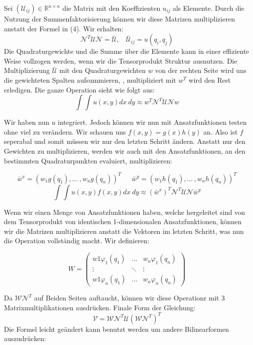 Sei $(\mathcal{U}_{ij}) \in \mathbb{R}^{n \times n}$ die Matrix mit den Koeffizienten $u_{ij}$ als Elemente.
Durch die Nutzung der Summenfaktorisierung können wir diese Matrizen multiplizieren anstatt der Formel in (4). Wir erhalten: 
\begin{equation}
\mathcal{N}^T \mathcal{U} \mathcal{N} = \bar{\mathcal{U}}, \ \ \ \ \bar{\mathcal{U}}_{ij} = u(q_i,q_j)
\end{equation}
Die Quadraturgewichte und die Summe über die Elemente kann in einer effiziente Weise vollzogen werden, wenn wir die Tensorprodukt Struktur ausnutzen. Die Multiplizierung $\bar{\mathcal{U}}$ mit den Quadraturgewichten $w$ von der rechten Seite wird uns die gewichteten Spalten aufsummieren, , multipliziert mit $w^T$ wird den Rest erledigen. Die ganze Operation sieht wie folgt aus: 
\begin{equation}
\int \int u(x,y) dx \ dy \approx w^T \mathcal{N}^T \mathcal{U} \mathcal{N} w
\end{equation} 

Wir haben nun $u$ integriert. Jedoch können wir nun mit Ansatzfunktionen testen ohne viel zu verändern.
Wir schauen uns $f(x,y)=g(x)h(y)$ an. Also ist $f$ seperabal und somit müssen wir nur den letzten Schritt ändern. Anstatt nur den Gewichten zu multiplizieren, werden wir auch mit den Ansatzfunktionen, an den bestimmten Quadraturpunkten evaluiert, multiplizieren:

\[\bar{w}^x=(w_1 g(q_1), ... \ ,w_n g(q_n))^T \ \ \ \ \ \ \ \bar{w}^y=(w_1 h(q_1), ... \ ,w_n h(q_n))^T\]
\begin{equation}
\int \int u(x,y) f(x,y) dx \ dy \approx (\bar{w}^x)^T \mathcal{N}^T \mathcal{U} \mathcal{N} \bar{w}^y
\end{equation}

Wenn wir einen Menge von Ansatzfunktionen haben, welche hergeleitet sind von dem Tensorprodukt von identischen 1-dimensionalen Ansatzfunktionen, können wir die Matrizen multiplizieren anstatt die Vektoren im letzten Schritt, was nun die Operation vollständig macht. Wir definieren:

\[W=
\begin{pmatrix}
w1 \varphi_1(q_1) & \hdots & w_n \varphi_1(q_n) \\
\vdots & \ddots & \vdots \\
w1 \varphi_n(q_1) & \hdots & w_n \varphi_n(q_n)
\end{pmatrix}
\]

Da  $\mathcal{W} \mathcal{N}^T$ auf Beiden Seiten auftaucht, können wir diese Operationr mit 3 Matrixmultiplikationen ausdrücken. Finale Form der Gleichung:
\begin{equation}
\mathcal{V} = \mathcal{W} \mathcal{N}^T \mathcal{U} (\mathcal{W} \mathcal{N}^T)^T
\end{equation}
Die Formel leicht geändert kann benutzt werden um andere Bilinearformen auszudrücken:

